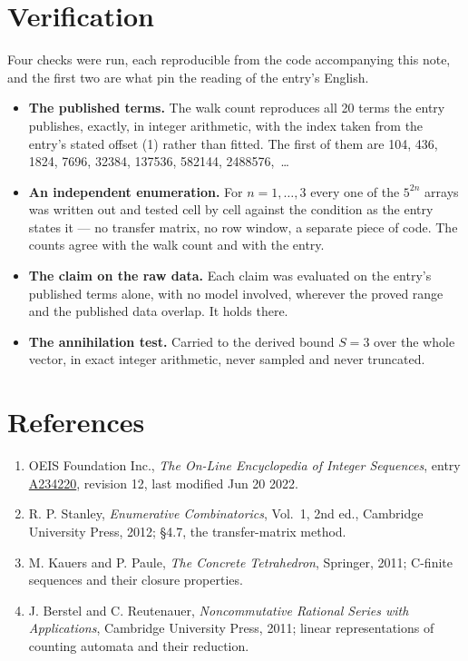 \documentclass[11pt]{article}
\theoremstyle{definition}
\begin{document}
\section{Verification}

Four checks were run, each reproducible from the code accompanying this note, and the first two are what pin the reading of the entry's English.

\begin{itemize}

\item {\bfseries The published terms.} The walk count reproduces all 20 terms the entry publishes, exactly, in integer arithmetic, with the index taken from the entry's stated offset (1) rather than fitted. The first of them are 104, 436, 1824, 7696, 32384, 137536, 582144, 2488576,~\dots

\item {\bfseries An independent enumeration.} For $n = 1,\dots,3$ every one of the $5^{2n}$ arrays was written out and tested cell by cell against the condition as the entry states it --- no transfer matrix, no row window, a separate piece of code. The counts agree with the walk count and with the entry.

\item {\bfseries The claim on the raw data.} Each claim was evaluated on the entry's published terms alone, with no model involved, wherever the proved range and the published data overlap. It holds there.

\item {\bfseries The annihilation test.} Carried to the derived bound $S = 3$ over the whole vector, in exact integer arithmetic, never sampled and never truncated.

\end{itemize}

\section{References}

\begin{enumerate}

\item OEIS Foundation Inc., \emph{The On-Line Encyclopedia of Integer Sequences}, entry \href{https://oeis.org/A234220}{A234220}, revision 12, last modified Jun 20 2022.

\item R. P. Stanley, \emph{Enumerative Combinatorics}, Vol.~1, 2nd ed., Cambridge University Press, 2012; \S4.7, the transfer-matrix method.

\item M. Kauers and P. Paule, \emph{The Concrete Tetrahedron}, Springer, 2011; C-finite sequences and their closure properties.

\item J. Berstel and C. Reutenauer, \emph{Noncommutative Rational Series with Applications}, Cambridge University Press, 2011; linear representations of counting automata and their reduction.

\end{enumerate}
\end{document}
